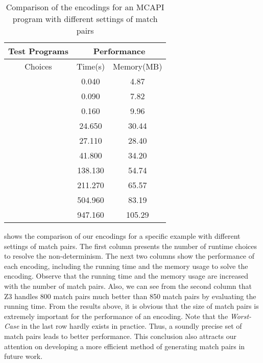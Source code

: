 \begin{table}
\begin{center}
\setlength{\tabcolsep}{2pt}
\scriptsize
\begin{tabular}{|c|c|c|}
		\hline
         \multicolumn{1}{|c|}{Test Programs} & \multicolumn{2}{|c|}{Performance} \\ \hline
          Choices &  Time(s) & Memory(MB) \\ \hline
           &  0.040 & 4.87 \\
           &  0.090 & 7.82 \\
           &  0.160 & 9.96 \\
           &  24.650 & 30.44 \\
           &  27.110 & 28.40 \\
          &  41.800 & 34.20 \\
          &  138.130 & 54.74 \\
          &  211.270 & 65.57 \\
           &  504.960 & 83.19 \\
           &  947.160 & 105.29 \\
         \hline
		\end{tabular}
\end{center}
\caption{Comparison of the encodings for an MCAPI program with different settings of match pairs}
\label{table:first}
\end{table}

 shows the comparison of our encodings for a specific example with different settings of match pairs. The first column presents the number of runtime choices to resolve the non-determinism. The next two columns show the performance of each encoding, including the running time and the memory usage to solve the encoding. Observe that the running time and the memory usage are increased with the number of match pairs. Also, we can see from the second column that Z3 handles 800 match pairs much better than 850 match pairs by evaluating the running time. From the results above, it is obvious that the size of match pairs is extremely important for the performance of an encoding. Note that the \textit{Worst-Case} in the last row hardly exists in practice. Thus, a soundly precise set of match pairs leads to better performance. This conclusion also attracts our attention on developing a more efficient method of generating match pairs in future work.



